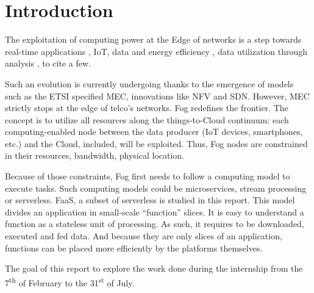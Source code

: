 \newcommand{\varthreestars}{\begin{center}\begin{tabular}{c}$\ast$\\[-2ex] $\ast\enspace \ast $\end{tabular}\end{center}}

\section{Introduction}
The exploitation of computing power at the Edge of networks is a step towards real-time applications \cite{rausch_towards_2021,lin_cloudfog_2017}, \gls{IoT}, data and energy efficiency \cite{ieee_standards_association_ieee_2018}, data utilization through analysis \cite{openfog_consortium_real-time_2018}, to cite a few.

Such an evolution is currently undergoing thanks to the emergence of models such as the \gls{ETSI} specified \gls{MEC}, innovations like \gls{NFV} and \gls{SDN}. However, \gls{MEC} strictly stops at the edge of telco’s networks. Fog redefines the frontier. The concept is to utilize all resources along the things-to-Cloud continuum: each computing-enabled node between the data producer (\gls{IoT} devices, smartphones, etc.) and the Cloud, included, will be exploited. Thus, Fog nodes are constrained in their resources, bandwidth, physical location.

Because of those constraints, Fog first needs to follow a computing model to execute tasks. Such computing models could be microservices, stream processing or serverless. \gls{FaaS}, a subset of serverless is studied in this report. This model divides an application in small-scale “function” slices. It is easy to understand a function as a stateless unit of processing. As such, it requires to be downloaded, executed and fed data. And because they are only slices of an application, functions can be placed more efficiently by the platforms themselves.

The goal of this report to explore the work done during the internship from the 7\textsuperscript{th} of February to the 31\textsuperscript{st} of July.

